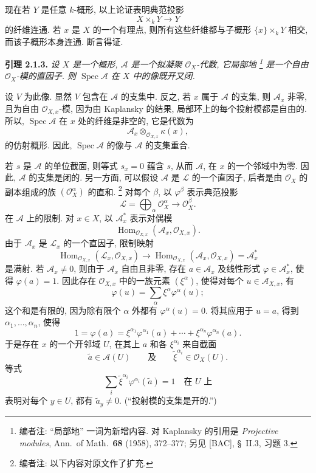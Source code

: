 现在若 \(Y\) 是任意 \(k\)-概形,
以上论证表明典范投影
\[
  X\times_kY\longrightarrow Y
\]
的纤维连通. 若 \(x\) 是 \(X\) 的一个有理点,
则所有这些纤维都与子概形 \(\{x\}\times_kY\) 相交,
而该子概形本身连通. 断言得证.

\medskip
{}\label{lem:sga3-VIA-2.1.3}%
\noindent\textbf{引理 2.1.3.}
\textit{设 \(X\) 是一个概形, \(\mathcal A\) 是一个拟凝聚
\(\mathcal O_X\)-代数, 它局部地%
\footnote{\label{note:sga3-VIA-18}编者注: ``局部地'' 一词为新增内容.
对 Kaplansky 的引用是 \emph{Projective modules},
Ann.\ of Math.\ \textbf{68} (1958), 372--377;
另见 \textup{[BAC]}, \S~II.3, 习题 3.}
是一个自由 \(\mathcal O_X\)-模的直因子.
则 \(\operatorname{Spec}\mathcal A\) 在 \(X\) 中的像既开又闭.}

\medskip
设 \(V\) 为此像.
显然 \(V\) 包含在 \(\mathcal A\) 的支集中.
反之, 若 \(x\) 属于 \(\mathcal A\) 的支集,
则 \(\mathcal A_x\) 非零, 且为自由 \(\mathcal O_{X,x}\)-模,
因为由 Kaplansky 的结果, 局部环上的每个投射模都是自由的.
所以, \(\operatorname{Spec}\mathcal A\) 在 \(x\) 处的纤维是非空的,
它是代数为
\[
  \mathcal A_x\otimes_{\mathcal O_{X,x}}\kappa(x),
\]
的仿射概形.
因此, \(\operatorname{Spec}\mathcal A\) 的像与 \(\mathcal A\) 的支集重合.

若 \(s\) 是 \(\mathcal A\) 的单位截面,
则等式 \(s_x=0\) 蕴含 \(s\), 从而 \(\mathcal A\),
在 \(x\) 的一个邻域中为零.
因此, \(\mathcal A\) 的支集是闭的.
另一方面, 可以假设 \(\mathcal A\) 是 \(\mathcal L\) 的一个直因子,
后者是由 \(\mathcal O_X\) 的副本组成的族
\((\mathcal O_X^\alpha)\) 的直和.%
\footnote{\label{note:sga3-VIA-19}编者注: 以下内容对原文作了扩充.}
对每个 \(\beta\), 以 \(\varphi^\beta\) 表示典范投影
\[
  \mathcal L=\bigoplus_\alpha\mathcal O_X^\alpha
    \longrightarrow\mathcal O_X^\beta.
\]
在 \(\mathcal A\) 上的限制.
对 \(x\in X\), 以 \(\mathcal A_x^*\) 表示对偶模
\[
  \operatorname{Hom}_{\mathcal O_{X,x}}
    (\mathcal A_x,\mathcal O_{X,x}).
\]
由于 \(\mathcal A_x\) 是 \(\mathcal L_x\) 的一个直因子,
限制映射
\[
  \operatorname{Hom}_{\mathcal O_{X,x}}
    (\mathcal L_x,\mathcal O_{X,x})
  \longrightarrow
  \operatorname{Hom}_{\mathcal O_{X,x}}
    (\mathcal A_x,\mathcal O_{X,x})
  =\mathcal A_x^*
\]
是满射.
若 \(\mathcal A_x\ne0\), 则由于 \(\mathcal A_x\) 自由且非零,
存在 \(a\in\mathcal A_x\) 及线性形式 \(\varphi\in\mathcal A_x^*\),
使得 \(\varphi(a)=1\).
因此存在 \(\mathcal O_{X,x}\) 中的一族元素 \((\xi^\alpha)\),
使得对每个 \(u\in\mathcal A_{X,x}\), 有
\[
  \varphi(u)=\sum_\alpha\xi^\alpha\varphi^\alpha(u);
\]
这个和是有限的, 因为除有限个 \(\alpha\) 外都有 \(\varphi^\alpha(u)=0\).
将其应用于 \(u=a\), 得到 \(\alpha_1,\ldots,\alpha_n\), 使得
\[
  1=\varphi(a)
   =\xi^{\alpha_1}\varphi^{\alpha_1}(a)
    +\cdots+
    \xi^{\alpha_n}\varphi^{\alpha_n}(a).
\]
于是存在 \(x\) 的一个开邻域 \(U\),
在其上 \(a\) 和各 \(\xi^{\alpha_i}\) 来自截面
\[
  \widetilde a\in\mathcal A(U)
  \qquad\text{及}\qquad
  \widetilde\xi^{\alpha_i}\in\mathcal O_X(U).
\]
等式
\[
  \sum_i
    \widetilde\xi^{\alpha_i}
    \varphi^{\alpha_i}(\widetilde a)=1
  \quad\text{在 }U\text{ 上}
\]
表明对每个 \(y\in U\), 都有 \(\widetilde a_y\ne0\).
(``投射模的支集是开的.'')

